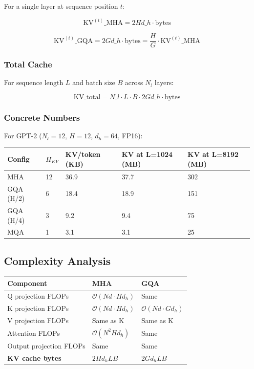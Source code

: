 For a single layer at sequence position $t$:

\[
\text{KV}^{(t)}\_\text{MHA} = 2 H d\_h \cdot \text{bytes}
\tag{4.5}
\]

\[
\text{KV}^{(t)}\_\text{GQA} = 2 G d\_h \cdot \text{bytes} = \frac{H}{G} \cdot \text{KV}^{(t)}\_\text{MHA}
\tag{4.6}
\]

\subsubsection{Total Cache}

For sequence length $L$ and batch size $B$ across $N_l$ layers:

\[
\text{KV}\_\text{total} = N\_l \cdot L \cdot B \cdot 2 G d\_h \cdot \text{bytes}
\tag{4.7}
\]

\subsubsection{Concrete Numbers}

For GPT-2 ($N_l = 12$, $H = 12$, $d_h = 64$, FP16):

\begin{table}[H]
\centering
\small
\begin{tabular}{lllll}
\toprule
\textbf{Config} & \textbf{$H_{KV}$} & \textbf{KV/token (KB)} & \textbf{KV at L=1024 (MB)} & \textbf{KV at L=8192 (MB)} \\
\midrule
MHA & 12 & 36.9 & 37.7 & 302 \\
GQA (H/2) & 6 & 18.4 & 18.9 & 151 \\
GQA (H/4) & 3 & 9.2 & 9.4 & 75 \\
MQA & 1 & 3.1 & 3.1 & 25 \\
\bottomrule
\end{tabular}
\end{table}

\subsection{Complexity Analysis}

\begin{table}[H]
\centering
\small
\begin{tabular}{lll}
\toprule
\textbf{Component} & \textbf{MHA} & \textbf{GQA} \\
\midrule
Q projection FLOPs & $\mathcal{O}(N d \cdot H d_h)$ & Same \\
K projection FLOPs & $\mathcal{O}(N d \cdot H d_h)$ & $\mathcal{O}(N d \cdot G d_h)$ \\
V projection FLOPs & Same as K & Same as K \\
Attention FLOPs & $\mathcal{O}(N^2 H d_h)$ & Same \\
Output projection FLOPs & Same & Same \\
\textbf{KV cache bytes} & $2 H d_h L B$ & $2 G d_h L B$ \\
\bottomrule
\end{tabular}
\end{table}

